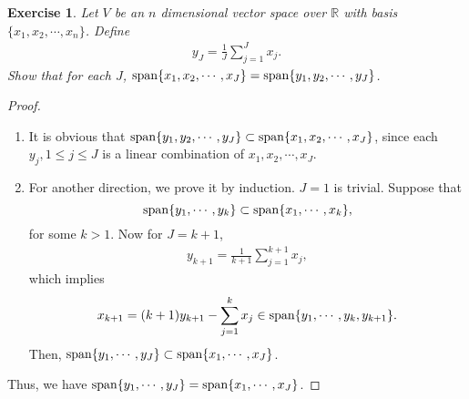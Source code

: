 \documentclass[11pt]{book}
\newtheorem{exercise}{Exercise}[section]
\theoremstyle{definition}
\numberwithin{equation}{subsection}
\begin{document}
\medskip

\begin{exercise}
Let $V$ be an $n$ dimensional vector space over $\mathbb{R}$ with basis $\{x_1, x_2, \cdots, x_n\}$. Define 
\begin{align*}
    y_J = \frac{1}{J} \sum^J_{j=1} x_j.
\end{align*}
Show that for each $J$, ${\rm span} \{x_1, x_2, \cdots, x_J\} = {\rm span} \{y_1, y_2, \cdots, y_J\}$.
\end{exercise}
\begin{proof}
~\begin{enumerate}[label=(\alph*)]
    \item It is obvious that ${\rm span} \{y_1, y_2, \cdots, y_J\} \subset {\rm span} \{x_1, x_2, \cdots, x_J\}$, since each $y_j, 1 \leq j \leq J$ is a linear combination of $x_1, x_2, \cdots, x_J$.
    
    \item For another direction, we prove it by induction. $J = 1$ is trivial. Suppose that $${\rm span} \{y_1, \cdots, y_k\} \subset {\rm span} \{x_1, \cdots, x_k\},$$ 
    for some $k > 1$. Now for $J = k + 1$, 
    \begin{align*}
        y_{k+1} = \frac{1}{k+1} \sum^{k+1}_{j=1} x_j,
    \end{align*}
    which implies
    \begin{align*}
        x_{k+1} = (k+1) y_{k+1} - \sum^k_{j=1} x_j \in {\rm span} \{y_1, \cdots, y_k, y_{k+1}\}.
    \end{align*}
    Then, ${\rm span} \{y_1, \cdots, y_J\} \subset {\rm span} \{x_1, \cdots, x_J\}$.
\end{enumerate}
Thus, we have ${\rm span} \{y_1, \cdots, y_J\} = {\rm span} \{x_1, \cdots, x_J\}$.
\end{proof}

\medskip
\end{document}
